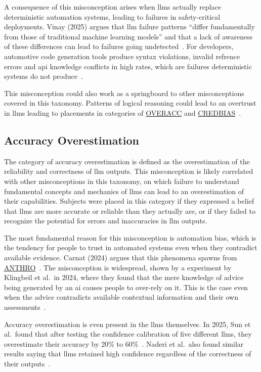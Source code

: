 A consequence of this misconception arises when \gls{llms} actually replace deterministic automation systems, leading to failures in safety-critical deployments. Vinay (2025) argues that \gls{llm} failure patterns ``differ fundamentally from those of traditional machine learning models'' and that a lack of awareness of these differences can lead to failures going undetected\ \cite{vinay_failure_2025}. For developers, automotive code generation tools produce syntax violations, invalid refrence errors and \gls{api} knowledge conflicts in high rates, which are failures deterministic systems do not produce\ \cite{pavel_hallucination_2025}.

This misconception could also work as a springboard to other misconceptions covered in this taxonomy. Patterns of logical reasoning could lead to an overtrust in \gls{llms} leading to placements in categories of \hyperref[overacc]{OVERACC} and \hyperref[credbias]{CREDBIAS}\ \cite{floridi_what_2025, nahar_fakes_2024}.

\subsection{Accuracy Overestimation}\label{overacc}
The category of accuracy overestimation is defined as the overestimation of the reliability and correctness of \gls{llm} outputs. This misconception is likely correlated with other misconceptions in this taxonomy, on which failure to understand fundamental concepts and mechanics of \gls{llms} can lead to an overestimation of their capabilities. Subjects were placed in this category if they expressed a belief that \gls{llms} are more accurate or reliable than they actually are, or if they failed to recognize the potential for errors and inaccuracies in \gls{llm} outputs.

The most fundamental reason for this misconception is automation bias, which is the tendency for people to trust in automated systems even when they contradict available evidence. Carnat (2024) argues that this phenomena spawns from \hyperref[anthro]{ANTHRO}\ \cite{carnat_human_2024}. The misconception is widespread, shown by a experiment by Klingbeil et al.\ in 2024, where they found that the mere knowledge of advice being generated by an \gls{ai} causes people to over-rely on it. This is the case even when the advice contradicts available contextual information and their own assessments\ \cite{klingbeil_trust_2024}.

Accuracy overestimation is even present in the \gls{llms} themselves. In 2025, Sun et al.\ found that after testing the confidence calibration of five different \gls{llms}, they overestimate their accuracy by 20\% to 60\%\ \cite{sun_large_2025}. Naderi et al.\ also found similar results saying that \gls{llms} retained high confidence regardless of the correctness of their outputs\ \cite{naderi_across_2026}.

